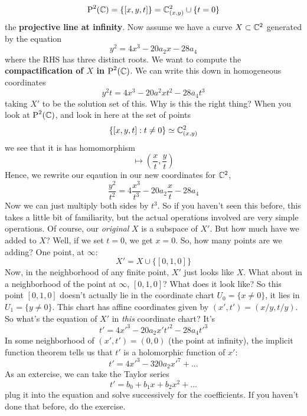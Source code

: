 \documentclass{article}
\begin{document}
\begin{equation}
  \operatorname{P}^{2}({\mathbb{C}}) = \{[x, y, t]\} = \mathbb{C}^2_{(x, y)} \cup \{t = 0\}
\end{equation}
the \textbf{projective line at infinity}.
Now assume we have a curve \(X \subset \mathbb{C}^2\) generated by the equation
\begin{equation}y^2 = 4x^3 - 20a_2x - 28a_4\end{equation}
where the RHS has three distinct roots. We want to compute the \textbf{compactification of \(X\) in \(\operatorname{P}^{2}({\mathbb{C}})\)}. We can write this down in homogeneous coordinates
\begin{equation}y^2t = 4x^3 - 20a^2xt^2 - 28a_4t^3\end{equation}
taking \(X'\) to be the solution set of this.
Why is this the right thing? When you look at \(\operatorname{P}^{2}({\mathbb{C}})\), and look in here at the set of points
\begin{equation}\{[x, y, t]: t \neq 0\} \simeq \mathbb{C}^2_{(x, y)}\end{equation}
we see that it is has homomorphism
\begin{equation}[x, y, t] \mapsto \left(\frac{x}{t}, \frac{y}{t}\right)\end{equation}
Hence, we rewrite our eqaution in our new coordinates for \(\mathbb{C}^2\),
\begin{equation}\frac{y^2}{t^2} = 4\frac{x^3}{t^3} - 20a_2\frac{x}{t} - 28a_4\end{equation}
Now we can just multiply both sides by \(t^3\). So if you haven't seen this before, this takes a little bit of familiarity, but the actual operations involved are very simple operations. Of course, our \textit{original} \(X\) is a subspace of \(X'\). But how much have we added to \(X\)? Well, if we set \(t = 0\), we get \(x = 0\). So, how many points are we adding? One point, at \(\infty\):
\begin{equation}X' = X \cup \{[0, 1, 0]\}\end{equation}
Now, in the neighborhood of any finite point, \(X'\) just looks like \(X\). What about in a neighborhood of the point at \(\infty\), \([0, 1, 0]\)? What does it look like?
So this point \([0, 1, 0]\) doesn't actually lie in the coordinate chart \(U_0 = \{x \neq 0\}\), it lies in \(U_1 = \{y \neq 0\}\). This chart has affine coordinates given by \((x', t') = (x/y, t/y)\). So what's the equation of \(X'\) in \textit{this} coordinate chart? It's
\begin{equation}t' = 4x'^3 - 20a_2x't'^2 - 28a_4t'^3\end{equation}
In some neighborhood of \((x', t') = (0, 0)\) (the point at infinity), the implicit function theorem tells us that \(t'\) is a holomorphic function of \(x'\):
\begin{equation}t' = 4x'^3 - 320a_2x'^7 + ...\end{equation}
As an extercise, we can take the Taylor series
\begin{equation}t' = b_0 + b_1x + b_2x^2 + ...\end{equation}
plug it into the equation and solve successively for the coefficients. If you haven't done that before, do the exercise.
\end{document}
